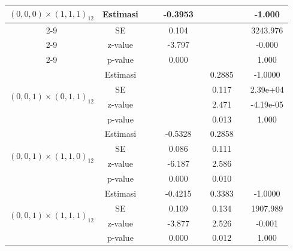 \begin{enumerate}[label=\alph*.]
\begin{longtable}{|c|c|c|c|c|c|c|c|c|}
            \multirow{4}{*}{$(0,0,0)\times(1,1,1)_{12}$}
            & Estimasi & {} & {} & -0.3953 & {} & {} & {} & -1.000\\ \cline{2-9}
            & SE       & {} & {} & 0.104 & {} & {} & {} & 3243.976\\ \cline{2-9}
            & z-value  & {} & {} & -3.797 & {}   & {}   & {} & -0.000\\ \cline{2-9}
            & p-value  & {} & {} & 0.000 & {} & {} & {} & 1.000\\ \hline

            \multirow{4}{*}{$(0,0,1)\times(0,1,1)_{12}$}
            & Estimasi & {} & {} & {} & {} & 0.2885 & {} & -1.0000 \\ \cline{2-9}
            & SE       & {} & {} & {} & {} & 0.117 & {} & 2.39e+04\\ \cline{2-9}
            & z-value  & {} & {} & {} & {} & 2.471 & {} & -4.19e-05\\ \cline{2-9}
            & p-value  & {} & {} & {} & {} & 0.013 & {} & 1.000\\ \hline

            \multirow{4}{*}{$(0,0,1)\times(1,1,0)_{12}$}
            & Estimasi & {} & {} & -0.5328 & {}  & 0.2858 & {} & {}\\ \cline{2-9}
            & SE       & {} & {} & 0.086 & {} & 0.111 & {} & {}\\ \cline{2-9}
            & z-value  & {} & {} & -6.187 & {} & 2.586 & {} & {}\\ \cline{2-9}
            & p-value  & {} & {} & 0.000 & {} & 0.010 & {} & {} \\ \hline

            \multirow{4}{*}{$(0,0,1)\times(1,1,1)_{12}$}
            & Estimasi & {} & {} & -0.4215 & {} & 0.3383 & {} & -1.0000 \\ \cline{2-9}
            & SE       & {} & {} & 0.109   & {} & 0.134 & {} & 1907.989\\ \cline{2-9}
            & z-value  & {} & {} & -3.877  & {} & 2.526 & {} & -0.001\\ \cline{2-9}
            & p-value  & {} & {} & 0.000   & {} & 0.012 & {} & 1.000 \\ \hline


\end{longtable}
\end{enumerate}
